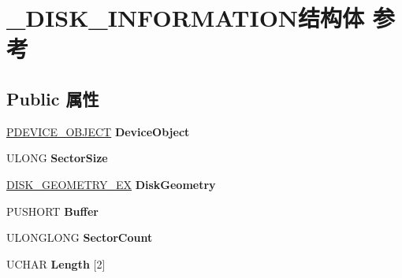 \hypertarget{struct___d_i_s_k___i_n_f_o_r_m_a_t_i_o_n}{}\section{\+\_\+\+D\+I\+S\+K\+\_\+\+I\+N\+F\+O\+R\+M\+A\+T\+I\+O\+N结构体 参考}
\label{struct___d_i_s_k___i_n_f_o_r_m_a_t_i_o_n}
\subsection*{Public 属性}
\begin{DoxyCompactItemize}
\item 
\mbox{\label{struct___d_i_s_k___i_n_f_o_r_m_a_t_i_o_n_a476a32ffb348690d261ad9daa40067e1}} 
\hyperlink{struct___d_e_v_i_c_e___o_b_j_e_c_t}{P\+D\+E\+V\+I\+C\+E\+\_\+\+O\+B\+J\+E\+CT} {\bfseries Device\+Object}
\item 
\mbox{\label{struct___d_i_s_k___i_n_f_o_r_m_a_t_i_o_n_a54d09b3dd3bf7b080cc78443c15d6082}} 
U\+L\+O\+NG {\bfseries Sector\+Size}
\item 
\mbox{\label{struct___d_i_s_k___i_n_f_o_r_m_a_t_i_o_n_af3db1be0740972f5cb116a909310cc84}} 
\hyperlink{struct___d_i_s_k___g_e_o_m_e_t_r_y___e_x}{D\+I\+S\+K\+\_\+\+G\+E\+O\+M\+E\+T\+R\+Y\+\_\+\+EX} {\bfseries Disk\+Geometry}
\item 
\mbox{\label{struct___d_i_s_k___i_n_f_o_r_m_a_t_i_o_n_a946c2868fc289d62fcacff54c485126b}} 
P\+U\+S\+H\+O\+RT {\bfseries Buffer}
\item 
\mbox{\label{struct___d_i_s_k___i_n_f_o_r_m_a_t_i_o_n_ab663e1d2686ebf5e78e80d13e7d58e13}} 
U\+L\+O\+N\+G\+L\+O\+NG {\bfseries Sector\+Count}
\item 
\mbox{\label{struct___d_i_s_k___i_n_f_o_r_m_a_t_i_o_n_aef66785335f33169d602e180be4bf1eb}} 
U\+C\+H\+AR {\bfseries Length} \mbox{[}2\mbox{]}
\item 
\mbox{\label{struct___d_i_s_k___i_n_f_o_r_m_a_t_i_o_n_a44a141b4f0db93c5908b94d8b8e3c6cf}} 

\end{DoxyCompactItemize}
